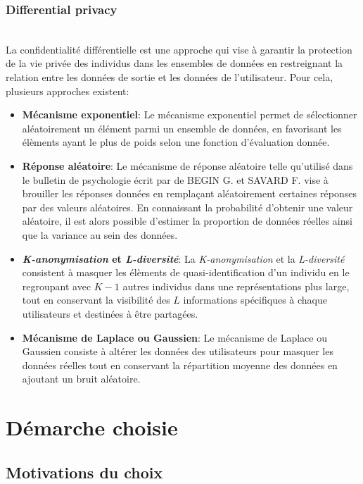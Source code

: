 \documentclass{article}
\begin{document}
\subsubsection{Differential privacy}
$ $\\
La confidentialité différentielle est une approche qui vise à garantir la protection de la vie privée des individus dans les ensembles de données en restreignant la relation entre les données de sortie et les données de l'utilisateur.
Pour cela, plusieurs approches existent:\\
\begin{itemize}
    \item \textbf{Mécanisme exponentiel}: Le mécanisme exponentiel \cite{programming_dp} permet de sélectionner aléatoirement un élément parmi un ensemble de données, en favorisant les élèments ayant le plus de poids selon une fonction d'évaluation donnée.
    \item \textbf{Réponse aléatoire}: Le mécanisme de réponse aléatoire telle qu'utilisé dans le bulletin de psychologie écrit par de BEGIN G. et SAVARD F. \cite{psychologie} vise à brouiller les réponses données en remplaçant aléatoirement certaines réponses par des valeurs aléatoires.
          En connaissant la probabilité d'obtenir une valeur aléatoire, il est alors possible d'estimer la proportion de données réelles ainsi que la variance au sein des données.
    \item \textbf{\emph{K-anonymisation} et \emph{L-diversité}}: La \emph{K-anonymisation}\cite{kanonymisation} et la \emph{L-diversité} consistent à masquer les élèments de quasi-identification d'un
          individu en le regroupant avec $K-1$ autres individus dans une représentations plus large, tout en conservant la visibilité des $L$ informations spécifiques à chaque utilisateurs et destinées à être partagées.
    \item \textbf{Mécanisme de Laplace ou Gaussien}: Le mécanisme de Laplace ou Gaussien \cite{laplace&gauss} consiste à altérer les données des utilisateurs pour masquer les données réelles tout en conservant la répartition moyenne des données en ajoutant un bruit aléatoire.
\end{itemize}

\section{Démarche choisie}
\subsection{Motivations du choix}
\end{document}
